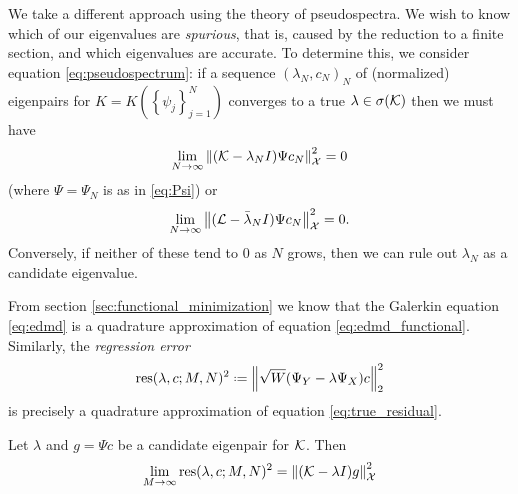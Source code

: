 We take a different approach using the theory of pseudospectra. We wish to know which of 
our eigenvalues are \emph{spurious}, that is, caused by the reduction to a finite section, 
and which eigenvalues are accurate. To determine this, we consider equation 
\ref{eq:pseudospectrum}: if a sequence $(\lambda_N, c_N)_N$ of (normalized) eigenpairs for 
$K = K(\left\{ \psi_j \right\}_{j=1}^N)$ converges to a true $\lambda \in \sigma (\mathcal{K})$ 
then we must have 
\begin{equation}
    \label{eq:true_residual}
    \lim_{N \to \infty} \left\| (\mathcal{K} - \lambda_N I) \Psi c_N \right\|_{\mathcal{X}}^2 = 0
\end{equation}
(where $\Psi = \Psi_N$ is as in \ref{eq:Psi}) or 
\begin{equation}
    \lim_{N \to \infty} \left\| (\mathcal{L} - \bar{\lambda}_N I) \Psi c_N \right\|_{\mathcal{X}}^2 = 0 . 
\end{equation}
Conversely, if neither of these tend to $0$ as $N$ grows, then we can rule out 
$\lambda_N$ as a candidate eigenvalue. 

From section \ref{sec:functional_minimization} we know that the Galerkin equation 
\ref{eq:edmd} is a quadrature approximation of equation \ref{eq:edmd_functional}. 
Similarly, the \emph{regression error}
\begin{equation}
    \label{eq:res}
    \res (\lambda, c; M, N)^2 \defeq \left\| \sqrt{W} (\YY - \lambda \YX) c \right\|_2^2
\end{equation}
is precisely a quadrature approximation of equation \ref{eq:true_residual}. 

\begin{theorem}
    \label{thm:res_M_limit}
    Let $\lambda$ and $g = \Psi c$ be a candidate eigenpair for $\mathcal{K}$. Then 
    \begin{equation}
        \lim_{M \to \infty} \text{res} (\lambda, c; M, N)^2
        = \left\| (\mathcal{K} - \lambda I) g \right\|_{\mathcal{X}}^2
    \end{equation}
\end{theorem}

